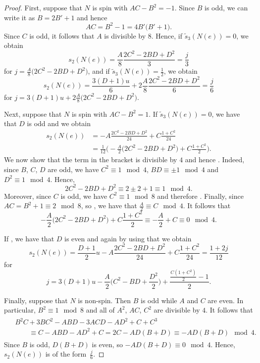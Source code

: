 \documentclass[pdftex]{sigma}
\numberwithin{equation}{section}
\theoremstyle{definition}
\numberwithin{table}{section}
\begin{document}
\begin{proof}
	First, suppose that $N$ is spin with $AC-B^2=-1$. Since $B$ is odd, we can write it as $B=2B'+1$ and hence
	\[ AC=B^2-1=4B'\bigl(B'+1\bigr). \]
	Since $C$ is odd, it follows that $A$ is divisible by $8$. Hence, if $\tilde{s}_3(N(e))=0$, we obtain
	\[ s_2(N(e))=\frac{A}{8}\frac{2C^2-2BD+D^2}{3}=\frac{j}{3} \]
	for $j=\frac{A}{8}\bigl(2C^2-2BD+D^2\bigr)$, and if $\tilde{s}_3(N(e))=\frac{1}{2}$, we obtain
	\[ s_2(N(e))=\frac{3(D+1)u}{6}+2\frac{A}{8}\frac{2C^2-2BD+D^2}{6}=\frac{j}{6} \]
	for $j=3(D+1)u+2\frac{A}{8}\bigl(2C^2-2BD+D^2\bigr)$.
	
	Next, suppose that $N$ is spin with $AC-B^2=1$. If $\tilde{s}_3(N(e))=0$, we have that $D$ is odd and we obtain
	\begin{align*}
    s_2(N(e))&=-A\frac{2C^2-2BD+D^2}{24}+C\frac{1+C^2}{24}\\
    &=\frac{1}{12}\biggl( -\frac{A}{2}\bigl(2C^2-2BD+D^2\bigr)+C\frac{1+C^2}{2} \biggr).
    \end{align*}
	We now show that the term in the bracket is divisible by $4$ and hence . Indeed, since $B$, $C$, $D$ are odd, we have $C^2\equiv 1\mod 4$, $BD\equiv\pm 1\mod 4$ and $D^2\equiv 1\mod 4$. Hence,
	\[ 2C^2-2BD+D^2\equiv 2\pm 2+1\equiv 1\mod 4. \]
	Moreover, since $C$ is odd, we have $C^2\equiv 1\mod 8$ and therefore . Finally, since $AC=B^2+1\equiv 2\mod 8$, so , we have that $\frac{A}{2}\equiv C\mod 4$. It follows that
	\[-\frac{A}{2}\bigl(2C^2-2BD+D^2\bigr)+C\frac{1+C^2}{2}\equiv -\frac{A}{2}+C\equiv 0\mod 4.  \]
	
	If , we have that $D$ is even and again by using that  we obtain
	\[ s_2(N(e))=\frac{D+1}{2}u-A\frac{2C^2-2BD+D^2}{24}+C\frac{1+C^2}{24}=\frac{1+2j}{12} \]
	for
	\[j=3(D+1)u-\frac{A}{2}\biggl(C^2-BD+\frac{D^2}{2}\biggr)+\frac{\frac{C(1+C^2)}{2}-1}{2}.\]
	
	Finally, suppose that $N$ is non-spin. Then $B$ is odd while $A$ and $C$ are even. In particular, $B^2\equiv 1\mod 8$ and all of $A^2$, $AC$, $C^2$ are divisible by $4$. It follows that
	\begin{align*}
\begin{split}
		&B^2C+3BC^2-ABD-3ACD-AD^2+C+C^3\\
& \qquad \equiv C-ABD-AD^2+C
		 =2C-AD(B+D)
		 \equiv -AD(B+D)\mod 4.
\end{split}
	\end{align*}
	Since $B$ is odd, $D(B+D)$ is even, so $-AD(B+D)\equiv 0\mod 4$. Hence, $s_2(N(e))$ is of the form~$\frac{j}{6}$.
	

\end{proof}
\end{document}
